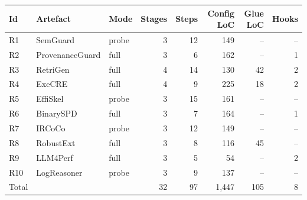 \begin{tabular}{@{}l l l r r r r r@{}}
\toprule
Id & Artefact & Mode & Stages & Steps & Config LoC & Glue LoC & Hooks \\
\midrule
R1 & SemGuard & probe & 3 & 12 & 149 & -- & -- \\
R2 & ProvenanceGuard & full & 3 & 6 & 162 & -- & 1 \\
R3 & RetriGen & full & 4 & 14 & 130 & 42 & 2 \\
R4 & ExeCRE & full & 4 & 9 & 225 & 18 & 2 \\
R5 & EffiSkel & probe & 3 & 15 & 161 & -- & -- \\
R6 & BinarySPD & full & 3 & 7 & 164 & -- & 1 \\
R7 & IRCoCo & probe & 3 & 12 & 149 & -- & -- \\
R8 & RobustExt & full & 3 & 8 & 116 & 45 & -- \\
R9 & LLM4Perf & full & 3 & 5 & 54 & -- & 2 \\
R10 & LogReasoner & probe & 3 & 9 & 137 & -- & -- \\
\midrule
Total & & & 32 & 97 & 1{,}447 & 105 & 8 \\
\bottomrule
\end{tabular}
